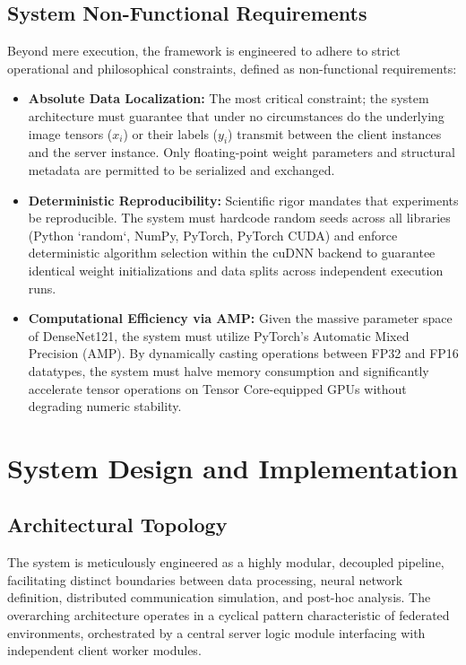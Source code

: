 \documentclass[12pt,a4paper]{report}
\begin{document}
\section{System Non-Functional Requirements}

Beyond mere execution, the framework is engineered to adhere to strict operational and philosophical constraints, defined as non-functional requirements:

\begin{itemize}
    \item \textbf{Absolute Data Localization:} The most critical constraint; the system architecture must guarantee that under no circumstances do the underlying image tensors ($x_i$) or their labels ($y_i$) transmit between the client instances and the server instance. Only floating-point weight parameters and structural metadata are permitted to be serialized and exchanged.
    \item \textbf{Deterministic Reproducibility:} Scientific rigor mandates that experiments be reproducible. The system must hardcode random seeds across all libraries (Python `random`, NumPy, PyTorch, PyTorch CUDA) and enforce deterministic algorithm selection within the cuDNN backend to guarantee identical weight initializations and data splits across independent execution runs.
    \item \textbf{Computational Efficiency via AMP:} Given the massive parameter space of DenseNet121, the system must utilize PyTorch's Automatic Mixed Precision (AMP). By dynamically casting operations between FP32 and FP16 datatypes, the system must halve memory consumption and significantly accelerate tensor operations on Tensor Core-equipped GPUs without degrading numeric stability.
\end{itemize}


\chapter{System Design and Implementation}

\section{Architectural Topology}

The system is meticulously engineered as a highly modular, decoupled pipeline, facilitating distinct boundaries between data processing, neural network definition, distributed communication simulation, and post-hoc analysis. The overarching architecture operates in a cyclical pattern characteristic of federated environments, orchestrated by a central server logic module interfacing with independent client worker modules.
\end{document}
